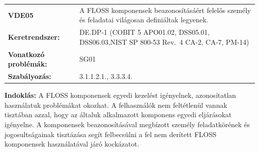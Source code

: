 \documentclass[12pt,magyar,a4paper,oneside]{scrreprt}
\begin{document}
\begin{longtable}[]{@{}ll@{}}
\toprule
\endhead
\begin{minipage}[t]{0.16\columnwidth}\raggedright
\textbf{VDE05}\strut
\end{minipage} & \begin{minipage}[t]{0.79\columnwidth}\raggedright
A FLOSS komponensek beazonosításáért felelős személy és feladatai
világosan definiáltak legyenek.\strut
\end{minipage}\tabularnewline
\begin{minipage}[t]{0.16\columnwidth}\raggedright
\textbf{Keretrendszer:}\strut
\end{minipage} & \begin{minipage}[t]{0.79\columnwidth}\raggedright
DE.DP-1 (COBIT 5 APO01.02, DSS05.01, DSS06.03,NIST SP 800-53 Rev.~4
CA-2, CA-7, PM-14)\strut
\end{minipage}\tabularnewline
\begin{minipage}[t]{0.16\columnwidth}\raggedright
\textbf{Vonatkozó problémák:}\strut
\end{minipage} & \begin{minipage}[t]{0.79\columnwidth}\raggedright
SG01\strut
\end{minipage}\tabularnewline
\begin{minipage}[t]{0.16\columnwidth}\raggedright
\textbf{Szabályozás:}\strut
\end{minipage} & \begin{minipage}[t]{0.79\columnwidth}\raggedright
3.1.1.2.1., 3.3.3.4.\strut
\end{minipage}\tabularnewline
\bottomrule
\end{longtable}

\textbf{Indoklás: } A FLOSS komponensek egyedi kezelést igényelnek,
azonosítatlan használatuk problémákat okozhat. A felhasználók nem
feltétlenül vannak tisztában azzal, hogy az általuk alkalmazott
komponens egyedi eljárásokat igényelne. A komponensek beazonosításával
megbízott személy feladatkörének és jogosultságainak tisztázása segít
felbecsülni a fel nem derített FLOSS komponensek használatával járó
kockázatot.
\end{document}
